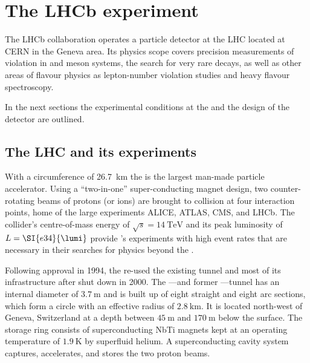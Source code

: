 
\chapter{The \acs*{LHCb} experiment}
\label{ch:lhcb_experiment}

The \ac{LHCb} collaboration operates a particle detector at the \ac{LHC} located
at \ac{CERN} in the Geneva area. Its physics scope covers precision measurements
of \CP violation in \B and \D meson systems, the search for very rare decays, as
well as other areas of flavour physics as lepton-number violation studies and
heavy flavour spectroscopy.

In the next sections the experimental conditions at the \LHC and the design
of the \LHCb detector are outlined.

\section{The \acs*{LHC} and its experiments}
\label{sec:lhcb_experiment:lhc}

With a circumference of \SI{26.7}{\kilo\metre} the \LHC is the largest man-made
particle accelerator. Using a \enquote{two-in-one} super-conducting magnet
design, two counter-rotating beams of protons (or ions) are brought to collision
at four interaction points, home of the large \LHC experiments \acs*{ALICE},
\acs*{ATLAS}, \acs*{CMS}, and \acs*{LHCb}. The collider's centre-of-mass energy
of $\sqrt{s}=\SI{14}{\TeV}$ and its peak luminosity of $L=\SI{e34}{\lumi}$
provide \LHC's experiments with high event rates that are necessary in their
searches for physics beyond the \SM.

Following approval in 1994, the \LHC re-used the existing \LEP tunnel and most
of its infrastructure after \LEP shut down in 2000. The \LHC---and former
\LEP---tunnel has an internal diameter of $\SI{3.7}{\metre}$ and is built up of
eight straight and eight arc sections, which form a circle with an effective
radius of $\SI{2.8}{\kilo\metre}$. It is located north-west of Geneva,
Switzerland at a depth between $\SI{45}{\metre}$ and $\SI{170}{\metre}$ below
the surface. The storage ring consists of superconducting NbTi magnets kept at
an operating temperature of $\SI{1.9}{\kelvin}$ by superfluid helium. A
superconducting \RF cavity system captures, accelerates, and stores the two
proton beams.


